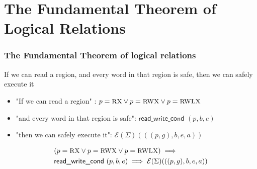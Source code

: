 \documentclass{beamer}
\newcommand{\interp}[2]{(#1)(#2)}
\begin{document}
\section{The Fundamental Theorem of Logical Relations}

\begin{frame}
\frametitle{The Fundamental Theorem of logical relations}
\begin{center}
If we can read a region, and every word in that region is safe, then we can safely execute it
\end{center}
\end{frame}
	
\begin{frame}
\begin{itemize}
	\item<2-> "If we can read a region" : $p = \textsc{\small RX} \vee p = \textsc{\small RWX} \vee p = \textsc{\small RWLX}$
	\item<3-> "and every word in that region is safe": $\textsf{read\_write\_cond }(p,b,e)$
	\item<4-> "then we can safely execute it": $\mathcal{E}\interp{\Sigma}{((p,g),b,e,a)}$
\end{itemize}

\begin{align*}
	&(p = \textsc{\small RX} \vee p = \textsc{\small RWX} \vee p = \textsc{\small RWLX}) \implies\\
	&\textsf{read\_write\_cond }(p,b,e) \implies \mathcal{E}\interp{\Sigma}{((p,g),b,e,a)}
\end{align*}
\end{frame}
\end{document}
